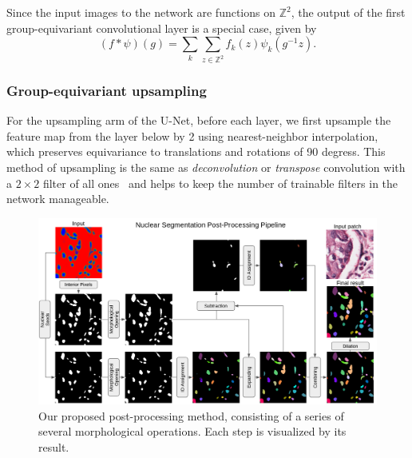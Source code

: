 Since the input images to the network are functions on $\mathbb{Z}^{2}$, the output of the first group-equivariant convolutional layer is a special case, given by
\begin{equation}
    (f\ast \psi)(g) = \sum_{k}\sum_{z\in \mathbb{Z}^{2}} f_{k}(z)\psi_{k}(g^{-1}z).
\end{equation}

\subsubsection*{Group-equivariant upsampling}

For the upsampling arm of the U-Net, before each layer, we first upsample the feature map from the layer below by 2 using nearest-neighbor interpolation, which preserves equivariance to translations and rotations of 90 degress.
This method of upsampling is the same as \emph{deconvolution} or \emph{transpose} convolution with a $2 \times 2$ filter of all ones~\cite{FCNs} and helps to keep the number of trainable filters in the network manageable.

\begin{figure}[thb]
\begin{center}
\includegraphics[width=\textwidth]{resources/4_post_processing.png}
\end{center}
   \caption{Our proposed post-processing method, consisting of a series of several morphological operations.
   Each step is visualized by its result.}
\label{fig:post_processing}
\end{figure}

